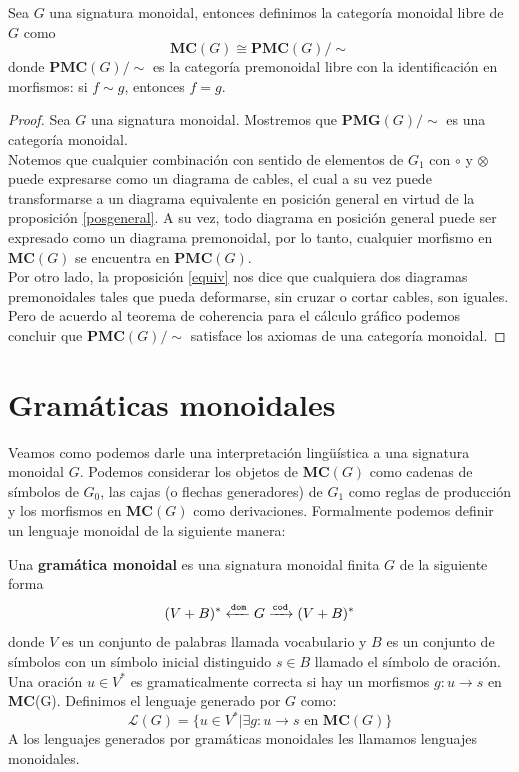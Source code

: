 \documentclass[../main.tex]{subfiles}
\begin{document}
\begin{prop}
        \label{freemonoidal}
	Sea $G$ una signatura monoidal, entonces definimos la categoría monoidal libre de $G$ como
	$$\textbf{MC}(G) \cong \textbf{PMC}(G) / \sim$$
    donde $\textbf{PMC}(G) / \sim$ es la categoría premonoidal libre con la identificación en morfismos: si $f \sim g$, entonces $f=g$.
\end{prop}

\begin{proof}
	Sea $G$ una signatura monoidal. Mostremos que \textbf{PMG}$(G)/\sim$ es una categoría monoidal.\\
	Notemos que cualquier combinación con sentido de elementos de $G_1$ con $\circ$ y $\otimes$ puede expresarse como un diagrama de cables, el cual a su vez puede transformarse a un diagrama equivalente en posición general en virtud de la proposición \ref{posgeneral}. A su vez, todo diagrama en posición general puede ser expresado como un diagrama premonoidal, por lo tanto, cualquier morfismo en $\textbf{MC}(G)$ se encuentra en $\textbf{PMC}(G)$. \\
	Por otro lado, la proposición \ref{equiv} nos dice que cualquiera dos diagramas premonoidales tales que pueda deformarse, sin cruzar o cortar cables, son iguales. Pero de acuerdo al teorema de coherencia para el cálculo gráfico podemos concluir que $\textbf{PMC}(G) / \sim$ satisface los axiomas de una categoría monoidal. 
\end{proof}

\section{Gramáticas monoidales}

Veamos como podemos darle una interpretación lingüística a  una signatura monoidal $G$. Podemos considerar los objetos de \textbf{MC}$(G)$ como cadenas de símbolos de $G_0$, las cajas (o flechas generadores) de $G_1$ como reglas de producción y los morfismos en \textbf{MC}$(G)$ como derivaciones. Formalmente podemos definir un lenguaje monoidal de la siguiente manera:

\begin{dfn}
	Una \textbf{gramática monoidal} es una signatura monoidal finita $G$ de la siguiente forma
	$$(V+B)^* \xleftarrow{\tt{dom}} G \xrightarrow{\tt{cod}} (V+B)^*$$
	donde $V$ es un conjunto de palabras llamada vocabulario y $B$ es un conjunto de símbolos con un símbolo inicial distinguido $s \in B$ llamado el símbolo de oración. \\
	Una oración $u \in V^*$ es gramaticalmente correcta si hay un morfismos $g:u \to s$ en \textbf{MC}(G). Definimos el lenguaje generado por $G$ como:
	$$\mathcal{L}(G)= \{ u \in V^* | \exists g: u \to s \text{ en } \textbf{MC}(G)\}$$
	A los lenguajes generados por gramáticas monoidales les llamamos lenguajes monoidales. 
\end{dfn}
\end{document}

